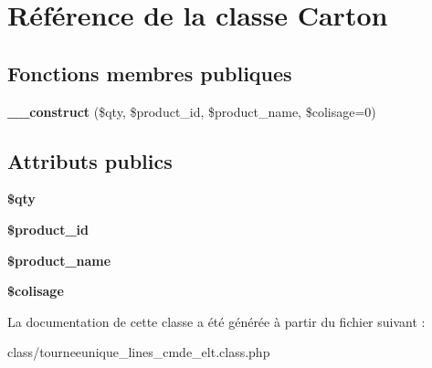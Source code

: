 \hypertarget{classCarton}{}\section{Référence de la classe Carton}
\label{classCarton}
\subsection*{Fonctions membres publiques}
\begin{DoxyCompactItemize}
\item 
\mbox{\label{classCarton_adaf38db134587da1db2c48031b18cc3d}} 
{\bfseries \+\_\+\+\_\+construct} (\$qty, \$product\+\_\+id, \$product\+\_\+name, \$colisage=0)
\end{DoxyCompactItemize}
\subsection*{Attributs publics}
\begin{DoxyCompactItemize}
\item 
\mbox{\label{classCarton_a7f386d72793d4dd5582254a764bd19ea}} 
{\bfseries \$qty}
\item 
\mbox{\label{classCarton_a06ae50ef47bde14319a97653c5de8d44}} 
{\bfseries \$product\+\_\+id}
\item 
\mbox{\label{classCarton_a42ba30aaed22f9db9a8087a7ba6b0c17}} 
{\bfseries \$product\+\_\+name}
\item 
\mbox{\label{classCarton_a1d0ade1a7feb63fcb23b4b51f422dd12}} 
{\bfseries \$colisage}
\end{DoxyCompactItemize}


La documentation de cette classe a été générée à partir du fichier suivant \+:\begin{DoxyCompactItemize}
\item 
class/tourneeunique\+\_\+lines\+\_\+cmde\+\_\+elt.\+class.\+php\end{DoxyCompactItemize}
